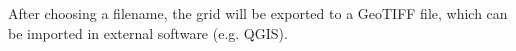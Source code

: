 After choosing a filename, the grid will be exported to a GeoTIFF file, which can be imported in external software (e.g. QGIS).










